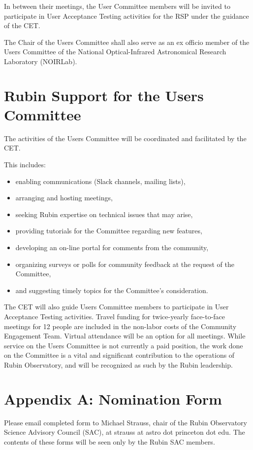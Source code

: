 \documentclass[OPS,toc]{lsstdoc}
\begin{document}
In between their meetings, the User Committee members will be invited to participate in User Acceptance Testing activities for the RSP under the guidance of the CET.  

The Chair of the Users Committee shall also serve as an ex officio member of the Users Committee of the National Optical-Infrared Astronomical Research Laboratory (NOIRLab). 

\section{Rubin Support for the Users Committee}

The activities of the Users Committee will be coordinated and facilitated by the CET.

This includes:
\begin{itemize}
\item enabling communications (Slack channels, mailing lists),
\item arranging and hosting meetings,
\item seeking Rubin expertise on technical issues that may arise,
\item providing tutorials for the Committee regarding new features,
\item developing an on-line portal for comments from the community,
\item organizing surveys or polls for community feedback at the request of the Committee, 
\item and suggesting timely topics for the Committee’s consideration.
\end{itemize}

The CET will also guide Users Committee members to participate in User Acceptance Testing activities.
Travel funding for twice-yearly face-to-face meetings for 12 people are included in the non-labor costs of the Community Engagement Team.
Virtual attendance will be an option for all meetings.
While service on the Users Committee is not currently a paid position, the work done on the Committee is a vital and significant contribution to the operations of Rubin Observatory, and will be recognized as such by the Rubin leadership. 

\appendix

\section{Appendix A: Nomination Form}

Please email completed form to Michael Strauss, chair of the Rubin Observatory Science Advisory Council (SAC), at strauss at astro dot princeton dot edu.
The contents of these forms will be seen only by the Rubin SAC members.
\end{document}
